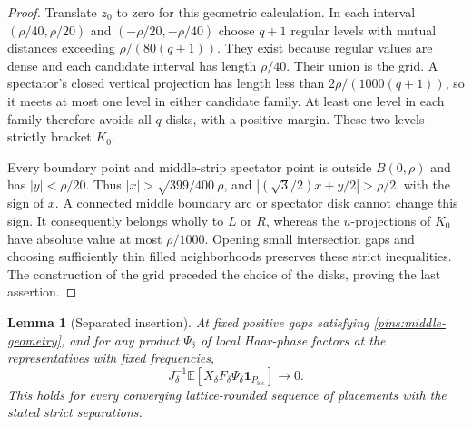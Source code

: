 \documentclass[11pt]{article}
\newcommand{\E}{\mathbb E}
\newcommand{\ind}{\mathbf 1}
\newtheorem{lemma}[theorem]{Lemma}
\theoremstyle{definition}
\theoremstyle{remark}
\numberwithin{equation}{section}
\begin{document}
\begin{proof}
Translate $z_0$ to zero for this geometric calculation.  In each
interval $(\rho/40,\rho/20)$ and $(-\rho/20,-\rho/40)$ choose
$q+1$ regular levels with mutual distances exceeding
$\rho/(80(q+1))$.  They exist because regular values are dense
and each candidate interval has length $\rho/40$.  Their union is
the grid.  A spectator's closed vertical projection has length less
than $2\rho/(1000(q+1))$, so it meets at most one level in either
candidate family.  At least one level in each family therefore
avoids all $q$ disks, with a positive margin.  These two levels
strictly bracket $K_0$.

Every boundary point and middle-strip spectator point is outside
$B(0,\rho)$ and has $|y|<\rho/20$.  Thus
$|x|>\sqrt{399/400}\,\rho$, and
$|(\sqrt3/2)x+y/2|>\rho/2$, with the sign of $x$.
A connected middle boundary arc or spectator disk cannot change this
sign.  It consequently belongs wholly to $L$ or $R$, whereas the
$u$-projections of $K_0$ have absolute value at most $\rho/1000$.
Opening small intersection gaps and choosing sufficiently thin filled
neighborhoods preserves these strict inequalities.  The construction
of the grid preceded the choice of the disks, proving the last assertion.
\end{proof}

\begin{lemma}[Separated insertion]\label{pins:three-moves}
At fixed positive gaps satisfying \eqref{pins:middle-geometry}, and for
any product $\Psi_\delta$ of local Haar-phase factors at the
representatives with fixed frequencies,
\begin{equation}\label{pins:separated-identity}
 J_\delta^{-1}\E\left[
 X_\delta F_\delta\Psi_\delta\ind_{P_{\mathrm{loc}}}\right]
 \longrightarrow0.
\end{equation}
This holds for every converging lattice-rounded sequence of placements
with the stated strict separations.
\end{lemma}
\end{document}
